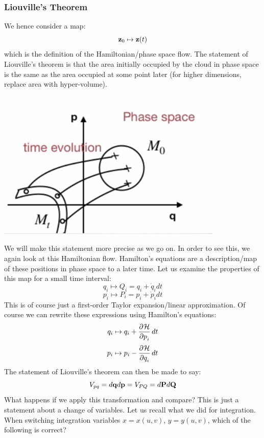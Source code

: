 \subsubsection{Liouville's Theorem}
We hence consider a map:
\[\mathbf{z}_0 \mapsto \mathbf{z}(t)\]
which is the definition of the Hamiltonian/phase space flow. The statement of Liouville's theorem is that the area initially occupied by the cloud in phase space is the same as the area occupied at some point later (for higher dimensions, replace area with hyper-volume). 
\begin{center}
    \includegraphics[scale=0.8]{Lecture-25/l25-img4.png}
\end{center}
We will make this statement more precise as we go on. In order to see this, we again look at this Hamiltonian flow. Hamilton's equations are a description/map of these positions in phase space to a later time. Let us examine the properties of this map for a small time interval:
\[q_i \mapsto Q_i = q_i + \dot{q}_idt\]
\[p_i \mapsto P_i = p_i + \dot{p}_idt\]
This is of course just a first-order Taylor expansion/linear approximation. Of course we can rewrite these expressions using Hamilton's equations:
\[q_i \mapsto q_i + \dpd{\HH}{p_i}dt\]
\[p_i \mapsto p_i - \dpd{\HH}{q_i}dt\]
The statement of Liouville's theorem can then be made to say:
\[V_{pq} = d\mathbf{q}d\mathbf{p} = V_{PQ} = d\mathbf{P}d\mathbf{Q}\]
What happens if we apply this transformation and compare? This is just a statement about a change of variables. Let us recall what we did for integration. When switching integration variables $x = x(u, v)$, $y = y(u, v)$, which of the following is correct?
